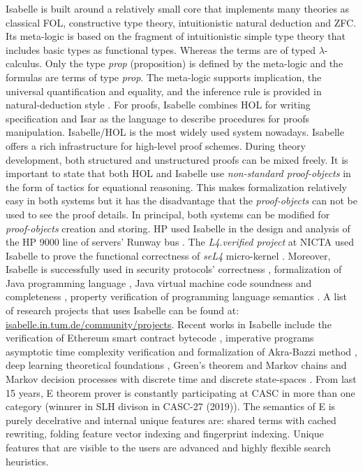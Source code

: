 Isabelle is built around a relatively small core that implements many theories as classical FOL, constructive type theory, intuitionistic 
natural deduction and ZFC. Its meta-logic is based on the fragment of intuitionistic simple type theory 
that includes basic types as functional types. Whereas the terms are of typed $\lambda$-calculus. Only the type {\em prop} (proposition) is defined by the meta-logic 
and the formulas are terms of type {\em prop}. The meta-logic supports implication, the universal quantification and equality, and the inference rule is 
provided in natural-deduction style . For proofs, Isabelle combines HOL for writing specification and Isar as the language to describe procedures for proofs 
manipulation. Isabelle/HOL  is the most widely used system nowadays.  
Isabelle offers a rich infrastructure for high-level proof schemes. During theory development, both structured and unstructured proofs can be mixed freely. 
It is important to state that both HOL and Isabelle use {\em non-standard proof-objects} in the form of tactics for equational reasoning. 
This makes formalization relatively easy in both systems but it has the disadvantage that the {\em proof-objects} can not be used to see the proof details. 
In principal, both systems can be modified for {\em proof-objects} creation and storing.
HP used Isabelle in the design and analysis of the HP 9000 line of servers' Runway bus . 
The \emph{L4.verified project} at NICTA used Isabelle to prove the 
functional correctness of \emph{seL4} micro-kernel . Moreover, Isabelle is successfully used in security protocols' 
correctness , formalization of Java programming language , Java virtual machine code soundness and 
completeness , property verification of programming 
language semantics .
A list of research projects that uses Isabelle can be found at: \url{isabelle.in.tum.de/community/projects}.
Recent works in Isabelle include the verification of Ethereum smart contract bytecode , 
 imperative programs asymptotic time complexity verification  and formalization of Akra-Bazzi method ,
deep learning theoretical foundations , Green's theorem  and 
Markov chains and Markov decision processes with discrete time and 
discrete state-spaces .
From last 15 years, E theorem prover is constantly participating at CASC in more than one category (winnrer in SLH divison in CASC-27 (2019)). 
The semantics of E is purely decelrative and internal unique features are: shared terms with cached rewriting, folding feature vector 
indexing and fingerprint indexing. Unique features that are visible to the users are advanced and highly flexible search heuristics.
